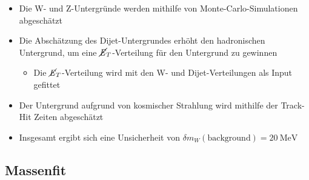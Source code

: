 \documentclass[aspectratio=1610, 9pt]{beamer}
\begin{document}
\begin{frame}
  \begin{itemize}
    \item Die W- und Z-Untergründe werden mithilfe von Monte-Carlo-Simulationen abgeschätzt
    \item Die Abschätzung des Dijet-Untergrundes erhöht den hadronischen Untergrund, um eine $\cancel{\it{E}}_{T}$-Verteilung für den Untergrund zu gewinnen
    \begin{itemize}
      \item[\rightarrow] Die $\cancel{\it{E}}_{T}$-Verteilung wird mit den W- und Dijet-Verteilungen als Input gefittet
    \end{itemize}
    \item Der Untergrund aufgrund von kosmischer Strahlung wird mithilfe der Track-Hit Zeiten abgeschätzt
    \item Insgesamt ergibt sich eine Unsicherheit von $\delta m_W (\text{background}) = \SI{20}{\MeV}$
  \end{itemize}
\end{frame}

\subsection{Massenfit}
\end{document}
